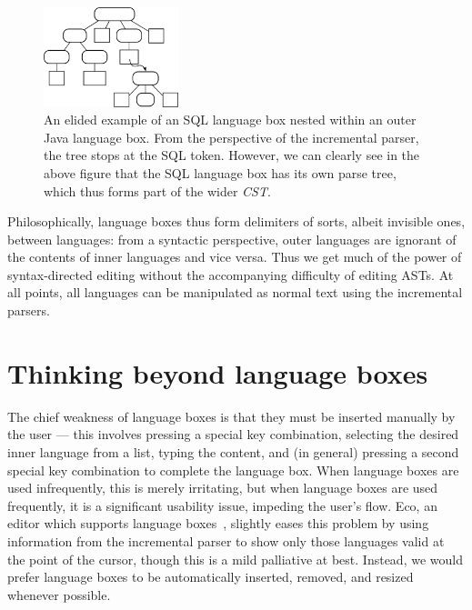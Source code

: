 \documentclass[sigplan,screen]{acmart}\settopmatter{printfolios=true,printccs=false,printacmref=false}
\newcommand{\inputtree}[0]{\emph{CST}\xspace}
\begin{document}
\begin{figure}[t]
\begin{center}
\includegraphics[width=0.35\textwidth]{images/lbox_parsetree}
\caption{An elided example of an SQL language box nested within an outer Java
language box. From the perspective of the incremental parser, the tree stops
at the SQL token. However, we can
clearly see in the above figure that the SQL language box has its own parse
tree, which thus forms part of the wider \inputtree.}
\label{fig:lboxtree}
\end{center}
\end{figure}

Philosophically, language boxes thus form delimiters of sorts, albeit invisible
ones, between languages: from a syntactic perspective, outer languages are
ignorant of the contents of inner languages and vice versa. Thus we get much of
the power of syntax-directed editing without the accompanying difficulty of
editing ASTs. At all points, all languages can be manipulated as normal text
using the incremental parsers.


\section{Thinking beyond language boxes}

\label{the problem}
The chief weakness of language boxes is that they must be inserted
manually by the user --- this involves pressing a special key combination,
selecting the desired inner language from a list, typing the content, and (in
general) pressing a second special key combination to complete the language box.
When language boxes are used infrequently, this is merely irritating,
but when language boxes are used frequently, it is a significant usability
issue, impeding the user's flow. Eco, an editor which supports language boxes~\cite{diekmann14eco},
slightly eases this problem by using information from the incremental parser to
show only those languages valid at the point of the cursor,
though this is a mild palliative at best. Instead, we would prefer language
boxes to be automatically inserted, removed, and resized whenever possible.
\end{document}
